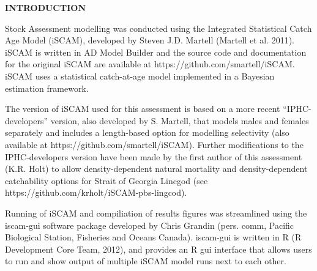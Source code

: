 \documentclass[11pt]{article}   %
\def\AppLet{D}                   %
\def\StartP{96}                 %
\begin{document}
   
\setcounter{page}{\StartP}

\begin{center}
\noindent {\bf \large APPENDIX~\AppLet.~~MODEL EQUATIONS}
\end{center}



{\bf INTRODUCTION}

Stock Assessment modelling was conducted using the Integrated Statistical Catch Age Model (iSCAM), developed by Steven J.D. Martell (Martell et al. 2011).  iSCAM is written in AD Model Builder and the source code and documentation for the original iSCAM are available at https://github.com/smartell/iSCAM.  iSCAM uses a statistical catch-at-age model implemented in a Bayesian estimation framework.  

The version of iSCAM used for this assessment is based on a more recent “IPHC-developers” version, also developed by S. Martell, that models males and females separately and includes a length-based option for modelling selectivity (also available at https://github.com/smartell/iSCAM).  Further modifications to the IPHC-developers version have been made by the first author of this assessment (K.R. Holt) to allow density-dependent natural mortality and density-dependent catchability options for Strait of Georgia Lincgod (see https://github.com/krholt/iSCAM-pbs-lingcod).


Running of iSCAM and compiliation of results figures was streamlined using the iscam-gui software package developed by Chris Grandin (pers. comm, Pacific Biological Station, Fisheries and Oceans Canada).  iscam-gui is written in R (R Development Core Team, 2012), and provides an R gui interface that allows users to run and show output of multiple iSCAM model runs next to each other.  
\end{document}

